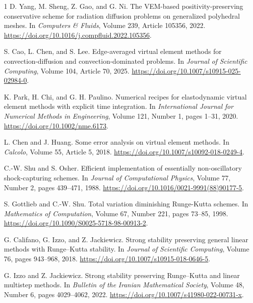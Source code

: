 \documentclass{article}
\begin{document}
\begin{thebibliography}{1}
D. Yang, M. Sheng, Z. Gao, and G. Ni.
\newblock The VEM-based positivity-preserving conservative scheme for radiation diffusion problems on generalized polyhedral meshes.
\newblock In {\em Computers \& Fluids}, Volume 239, Article 105356, 2022.
\newblock \url{https://doi.org/10.1016/j.compfluid.2022.105356}.

S. Cao, L. Chen, and S. Lee.
\newblock Edge-averaged virtual element methods for convection-diffusion and convection-dominated problems.
\newblock In {\em Journal of Scientific Computing}, Volume 104, Article 70, 2025.
\newblock \url{https://doi.org/10.1007/s10915-025-02984-0}.

K. Park, H. Chi, and G. H. Paulino.
\newblock Numerical recipes for elastodynamic virtual element methods with explicit time integration.
\newblock In {\em International Journal for Numerical Methods in Engineering}, Volume 121, Number 1, pages 1--31, 2020.
\newblock \url{https://doi.org/10.1002/nme.6173}.


L. Chen and J. Huang.
\newblock Some error analysis on virtual element methods.
\newblock In {\em Calcolo}, Volume 55, Article 5, 2018.
\newblock \url{https://doi.org/10.1007/s10092-018-0249-4}.

C.-W. Shu and S. Osher.
\newblock Efficient implementation of essentially non-oscillatory shock-capturing schemes.
\newblock In {\em Journal of Computational Physics}, Volume 77, Number 2, pages 439--471, 1988.
\newblock \url{https://doi.org/10.1016/0021-9991(88)90177-5}.

S. Gottlieb and C.-W. Shu.
\newblock Total variation diminishing Runge-Kutta schemes.
\newblock In {\em Mathematics of Computation}, Volume 67, Number 221, pages 73--85, 1998.
\newblock \url{https://doi.org/10.1090/S0025-5718-98-00913-2}.

G. Califano, G. Izzo, and Z. Jackiewicz.
\newblock Strong stability preserving general linear methods with Runge--Kutta stability.
\newblock In {\em Journal of Scientific Computing}, Volume 76, pages 943--968, 2018.
\newblock \url{https://doi.org/10.1007/s10915-018-0646-5}.

G. Izzo and Z. Jackiewicz.
\newblock Strong stability preserving Runge--Kutta and linear multistep methods.
\newblock In {\em Bulletin of the Iranian Mathematical Society}, Volume 48, Number 6, pages 4029--4062, 2022.
\newblock \url{https://doi.org/10.1007/s41980-022-00731-x}.















\end{thebibliography}
\end{document}

